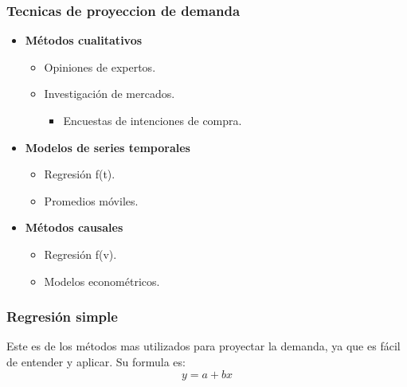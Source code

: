 \documentclass{templateNote}
\begin{document}
\subsubsection{Tecnicas de proyeccion de demanda}
\vspace{0.5cm}
\begin{center}
    \begin{minipage}[H]{0.45\textwidth}
        \begin{itemize}
            \item \textbf{Métodos cualitativos} 
            \begin{itemize}
                \item Opiniones de expertos.
                \item Investigación de mercados.
                \begin{itemize}
                    \item Encuestas de intenciones de compra.
                \end{itemize}
            \end{itemize}
        \end{itemize}
    \end{minipage}
    \hfill
    \begin{minipage}[H]{0.45\textwidth}
        \begin{itemize}
            \item \textbf{Modelos de series temporales}
            \begin{itemize}
                \item Regresión f(t).
                \item Promedios móviles.
            \end{itemize}
            \item \textbf{Métodos causales}
            \begin{itemize}
                \item Regresión f(v).
                \item Modelos econométricos.
            \end{itemize} 
        \end{itemize}
    \end{minipage}
\end{center}

\subsubsection{Regresión simple}
Este es de los métodos mas utilizados para proyectar la demanda, ya que es fácil de entender y aplicar. Su formula es:
\begin{equation*}
    y = a + bx
\end{equation*}
\end{document}
